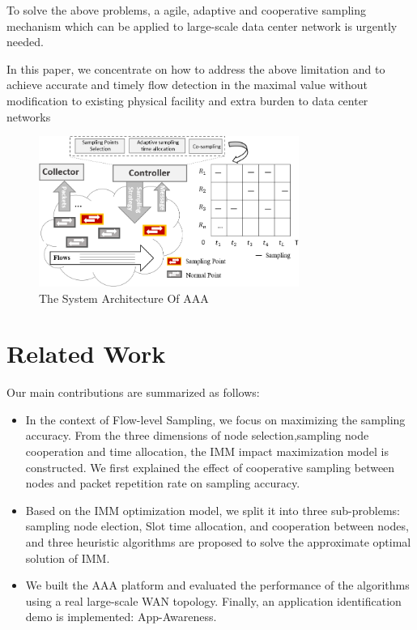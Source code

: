 \documentclass[conference,compsoc]{IEEEtran}
\begin{document}
To solve the above problems, a agile, adaptive and cooperative sampling mechanism which can be applied to large-scale data center network is urgently needed. 

In this paper, we concentrate on how to address the above limitation and to achieve accurate and timely flow detection in the maximal value without modification to existing physical facility and extra burden to data center networks

\begin{figure}[!hhhhhhhhhht]
\centering
\includegraphics[width=8.5cm]{images/png_architecture.png}
\caption{The System Architecture Of AAA}
\label{Architecture}
\end{figure}

\section{Related Work}
Our main contributions are summarized as follows:
\begin{itemize}[leftmargin=*]
\setlength{\parindent}{0pt}

\item In the context of Flow-level Sampling, we focus on maximizing the sampling accuracy. From the three dimensions of  node selection,sampling node cooperation and time allocation, the IMM impact maximization model is constructed. We first explained the effect of cooperative sampling between nodes and packet repetition rate on sampling accuracy.
\item Based on the IMM optimization model, we split it into three sub-problems: sampling node election, Slot time allocation, and cooperation between nodes, and three heuristic algorithms are proposed to solve the approximate optimal solution of IMM.
\item We built the AAA platform and evaluated the performance of the algorithms using a real large-scale WAN topology. Finally, an application identification demo is implemented: App-Awareness.
\end{itemize}
\end{document}
